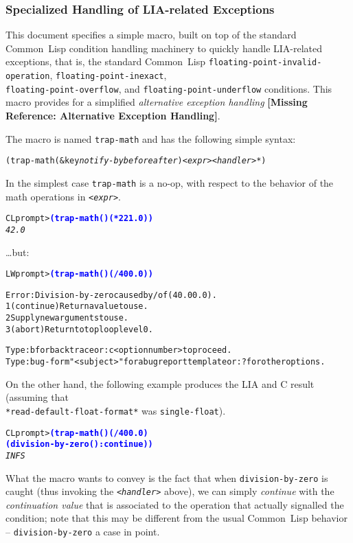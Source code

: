 \documentclass[10pt,fleqn]{article}
\newcommand{\CL}{\textsf{Common~Lisp}}
\newcommand{\CLang}{\textsf{C}}
\newcommand{\checkref}[1]{{\textbf{[Missing Reference: #1]}}}
\newcommand{\code}[1]{\texttt{#1}}
\newcommand{\clieeeterm}[1]{\textit{#1}}
\newcommand{\codeprompt}[1]{\textcolor{blue}{\textbf{#1}}}
\begin{document}
\subsubsection{Specialized Handling of LIA-related Exceptions}

This document specifies a simple macro, built on top of the standard
\CL{} condition handling machinery to quickly handle LIA-related
exceptions, that is, the standard \CL{} \code{floating-point-invalid-operation},
\code{floating-point-inexact},\\
\code{floating-point-overflow}, and
\code{floating-point-underflow} conditions.  This macro provides for
a simplified \clieeeterm{alternative exception handling}
\checkref{Alternative Exception Handling}.

The macro is named \code{trap-math} and has the following
simple syntax:
\begin{alltt}
  (trap-math (&key \textit{notify-by} \textit{before} \textit{after}) <\textit{expr}> <\textit{handler}>* )
\end{alltt}
In the simplest case \code{trap-math} is a no-op, with
respect to the behavior of the math operations in \code{<\textit{expr}>}.
\begin{alltt}
CL prompt> \codeprompt{(trap-math () (* 2 21.0))}
\textit{42.0}
\end{alltt}
\ldots but:
\begin{alltt}
LW prompt> \codeprompt{(trap-math () (/ 40 0.0))}

Error: Division-by-zero caused by / of (40.0 0.0).
  1 (continue) Return a value to use.
  2 Supply new arguments to use.
  3 (abort) Return to top loop level 0.

Type :b for backtrace or :c <option number> to proceed.
Type :bug-form "<subject>" for a bug report template or :? for other options.
\end{alltt}
On the other hand, the following example produces the LIA and \CLang{} result
(assuming that\\
\code{*read-default-float-format*} was \code{single-float}).
\begin{alltt}
CL prompt> \codeprompt{(trap-math () (/ 40 0.0)
               (division-by-zero () :continue))}
\textit{INFS}
\end{alltt}
What the macro wants to convey is the fact that when
\code{division-by-zero} is caught (thus invoking the
\code{<\textit{handler}>} above), we can simply \emph{continue} with
the \emph{continuation value} that is associated to the operation that
actually signalled the condition; note that this may be different from
the usual \CL{} behavior -- \code{division-by-zero} a case in point.
\end{document}
